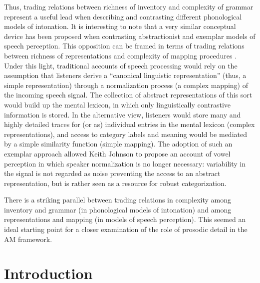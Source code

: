 Thus, trading relations between richness of inventory and complexity of grammar represent a useful lead when describing and contrasting different phonological models of intonation. It is interesting to note that a very similar conceptual device has been proposed when contrasting abstractionist and exemplar models of speech perception. This opposition can be framed in terms of trading relations between richness of representations and complexity of mapping procedures \citep{johnson1997complex}. Under this light, traditional accounts of speech processing would rely on the assumption that listeners derive a ``canonical linguistic representation'' (thus, a simple representation) through a normalization process (a complex mapping) of the incoming speech signal. The collection of abstract representations of this sort would build up the mental lexicon, in which only linguistically contrastive information is stored. In the alternative view, listeners would store many and highly detailed traces for (or as) individual entries in the mental lexicon (complex representations), and access to category labels and meaning would be mediated by a simple similarity function (simple mapping). The adoption of such an exemplar approach allowed Keith Johnson to propose an account of vowel perception \citep{johnson1997speech} in which speaker normalization is no longer necessary: variability in the signal is not regarded as noise preventing the access to an abstract representation, but is rather seen as a resource for robust categorization.

There is a striking parallel between trading relations in complexity among inventory and grammar (in phonological models of intonation) and among representations and mapping (in models of speech perception). This seemed an ideal starting point for a closer examination of the role of prosodic detail in the AM framework.

\section{Introduction}\label{sec21}
